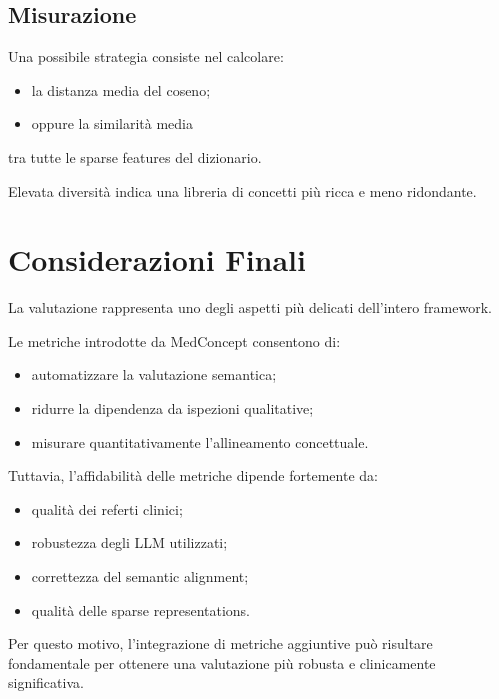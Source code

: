 \subsection{Misurazione}

Una possibile strategia consiste nel calcolare:

\begin{itemize}
    \item la distanza media del coseno;
    \item oppure la similarità media
\end{itemize}

tra tutte le sparse features del dizionario.

Elevata diversità indica una libreria di concetti più ricca e meno ridondante.

\section{Considerazioni Finali}

La valutazione rappresenta uno degli aspetti più delicati dell'intero framework.

Le metriche introdotte da MedConcept consentono di:

\begin{itemize}
    \item automatizzare la valutazione semantica;
    \item ridurre la dipendenza da ispezioni qualitative;
    \item misurare quantitativamente l'allineamento concettuale.
\end{itemize}

Tuttavia, l'affidabilità delle metriche dipende fortemente da:

\begin{itemize}
    \item qualità dei referti clinici;
    \item robustezza degli LLM utilizzati;
    \item correttezza del semantic alignment;
    \item qualità delle sparse representations.
\end{itemize}

Per questo motivo, l'integrazione di metriche aggiuntive può risultare fondamentale per ottenere una valutazione più robusta e clinicamente significativa.